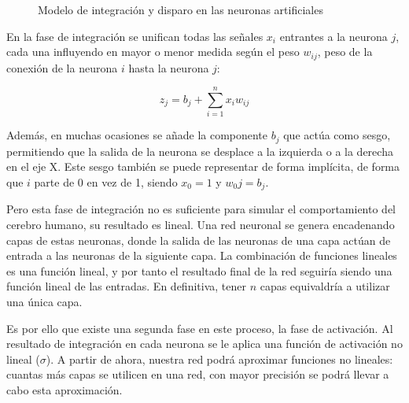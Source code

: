 \begin{figure}[H]
\centering
    \caption{Modelo de integración y disparo en las neuronas artificiales \cite{berzal2018redes}}
    \label{fig:integracion-disparo}
\end{figure}

En la fase de integración se unifican todas las señales $x_i$ entrantes a la neurona $j$, cada una influyendo en mayor o menor medida según el peso $w_{ij}$, peso de la conexión de la neurona $i$ hasta la neurona $j$:

\begin{equation}
    z_j = b_j + \sum_{i=1}^{n} x_iw_{ij}
\end{equation}

Además, en muchas ocasiones se añade la componente $b_j$ que actúa como sesgo, permitiendo que la salida de la neurona se desplace a la izquierda o a la derecha en el eje X. Este sesgo también se puede representar de forma implícita, de forma que $i$ parte de 0 en vez de 1, siendo $x_0 = 1$ y $w_0j = b_j$. \cite{berzal2018redes}

Pero esta fase de integración no es suficiente para simular el comportamiento del cerebro humano, su resultado es lineal. Una red neuronal se genera encadenando capas de estas neuronas, donde la salida de las neuronas de una capa actúan de entrada a las neuronas de la siguiente capa. La combinación de funciones lineales es una función lineal, y por tanto el resultado final de la red seguiría siendo una función lineal de las entradas. En definitiva, tener $n$ capas equivaldría a utilizar una única capa.

Es por ello que existe una segunda fase en este proceso, la fase de activación. Al resultado de integración en cada neurona se le aplica una función de activación no lineal ($\sigma$). A partir de ahora, nuestra red podrá aproximar funciones no lineales: cuantas más capas se utilicen en una red, con mayor precisión se podrá llevar a cabo esta aproximación.

